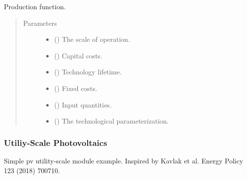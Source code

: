 \documentclass[letterpaper,10pt,english]{sphinxmanual}
\begin{document}
\begin{fulllineitems}
\label{\detokenize{technology:technology.pv_residential_simple.production}}
Production function.
\begin{quote}\begin{description}
\item[{Parameters}] \leavevmode\begin{itemize}
\item {} 
 () \textendash{} The scale of operation.

\item {} 
 () \textendash{} Capital costs.

\item {} 
 () \textendash{} Technology lifetime.

\item {} 
 () \textendash{} Fixed costs.

\item {} 
 () \textendash{} Input quantities.

\item {} 
 () \textendash{} The technological parameterization.

\end{itemize}

\end{description}\end{quote}

\end{fulllineitems}



\subsubsection{Utiliy-Scale Photovoltaics}
\label{\detokenize{technology:module-technology.utility_pv}}\label{\detokenize{technology:utiliy-scale-photovoltaics}}
Simple pv utility-scale module example.  Inspired by Kavlak et al. Energy Policy 123 (2018) 700\textendash{}710.
\end{document}
